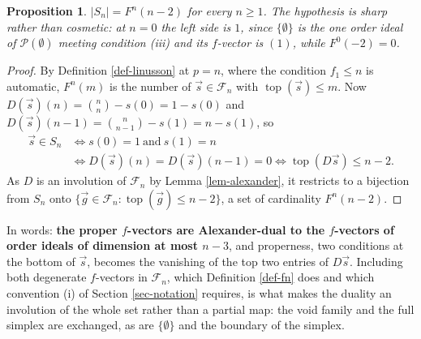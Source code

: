 \documentclass[11pt, a4paper, abstract=yes]{scrartcl}
\theoremstyle{definition}
\theoremstyle{remark}
\theoremstyle{plain}
\newtheorem{proposition}[definition]{Proposition}
\newcommand{\tp}{\operatorname{top}}
\begin{document}
\begin{proposition}
\(\lvert S_n\rvert=F^n(n-2)\) for every \(n\ge1\). The hypothesis is sharp rather than cosmetic: at
\(n=0\) the left side is \(1\), since \(\lbrace\emptyset\rbrace\) is the one order ideal of
\(\mathcal P(\emptyset)\) meeting condition (iii) and its \(f\)-vector is \((1)\), while \(F^0(-2)=0\).
\label{prop-fnn2}
\end{proposition}

\begin{proof}
By Definition \ref{def-linusson} at \(p=n\), where the condition \(f_1\le n\) is automatic,
\(F^n(m)\) is the number of \(\vec s\in\mathcal F_n\) with \(\tp(\vec s)\le m\). Now
\(D(\vec s)(n)=\binom nn-s(0)=1-s(0)\) and \(D(\vec s)(n-1)=\binom n{n-1}-s(1)=n-s(1)\), so
\begin{align*}
  \vec s\in S_n
  &\iff s(0)=1\ \text{and}\ s(1)=n\\
  &\iff D(\vec s)(n)=D(\vec s)(n-1)=0
   \iff \tp(D\vec s)\le n-2 .
\end{align*}
As \(D\) is an involution of \(\mathcal F_n\) by Lemma \ref{lem-alexander}, it restricts to a bijection
from \(S_n\) onto \(\lbrace\vec g\in\mathcal F_n:\tp(\vec g)\le n-2\rbrace\), a set of cardinality
\(F^n(n-2)\).
\end{proof}

In words: \textbf{the proper \(f\)-vectors are Alexander-dual to the \(f\)-vectors of order ideals of
dimension at most \(n-3\)}, and properness, two conditions at the bottom of \(\vec s\), becomes
the vanishing of the top two entries of \(D\vec s\). Including both degenerate \(f\)-vectors in
\(\mathcal F_n\), which Definition \ref{def-fn} does and which convention (i) of Section
\ref{sec-notation} requires, is what makes the duality an involution of the whole set rather than a
partial map: the void family and the full simplex are exchanged, as are \(\lbrace\emptyset\rbrace\)
and the boundary of the simplex.
\end{document}
